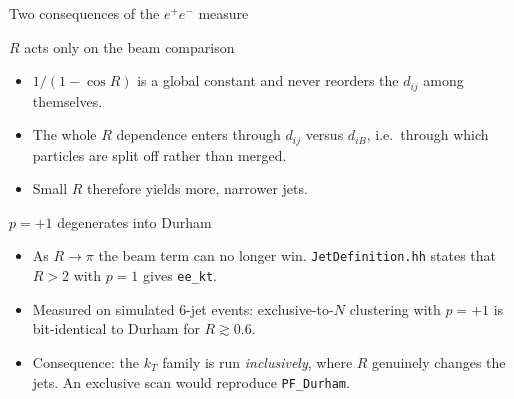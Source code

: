 \documentclass[aspectratio=169,10pt]{beamer}
\newcommand{\ee}{$e^{+}e^{-}$}
\newcommand{\dij}{d_{ij}}
\newcommand{\diB}{d_{iB}}
\newcommand{\Cdur}[1]{\textcolor{pfblue}{#1}}
\begin{document}
\begin{frame}{Two consequences of the \texorpdfstring{\ee{}}{ee} measure}

  \begin{block}{$R$ acts only on the beam comparison}
    \begin{itemize}
      \item $1/(1-\cos R)$ is a global constant and never reorders the $\dij$
            among themselves.
      \item The whole $R$ dependence enters through $\dij$ versus $\diB$, i.e.\
            through which particles are split off rather than merged.
      \item Small $R$ therefore yields more, narrower jets.
    \end{itemize}
  \end{block}

  \begin{block}{$p = +1$ degenerates into Durham}
    \begin{itemize}
      \item As $R \to \pi$ the beam term can no longer win.
            \texttt{JetDefinition.hh} states that $R > 2$ with $p = 1$ gives
            \texttt{ee\_kt}.
      \item Measured on simulated 6-jet events: exclusive-to-$N$ clustering with
            $p = +1$ is bit-identical to Durham for $R \gtrsim 0.6$.
      \item Consequence: the $k_T$ family is run \emph{inclusively}, where $R$
            genuinely changes the jets. An exclusive scan would reproduce
            \Cdur{\texttt{PF\_Durham}}.
    \end{itemize}
  \end{block}
\end{frame}
\end{document}
